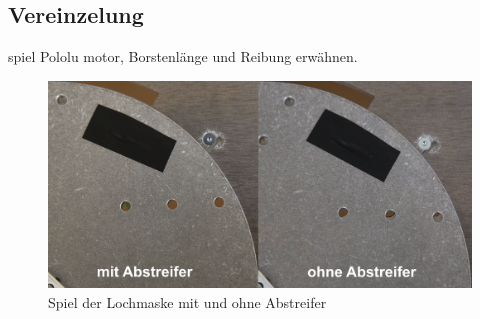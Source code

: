 \subsection{Vereinzelung}
spiel Pololu motor, Borstenlänge und Reibung erwähnen.

\begin{figure}[H]
	\includegraphics[width=1\textwidth]{Illustrationen/7-Inbetriebnahme_und_Kalibration/spiel_lochmaske.jpg}
	\caption{Spiel der Lochmaske mit und ohne Abstreifer}
	\label{fig:spiel_lochmaske}
\end{figure}